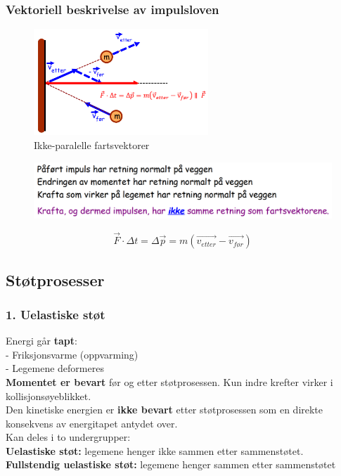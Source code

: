 \documentclass[12pt]{article}
\begin{document}
\subsubsection{Vektoriell beskrivelse av impulsloven}
\begin{figure} [H]
    \centering
    \includegraphics[height = 4cm]{images/impuls2.png}
    \caption{Ikke-paralelle fartsvektorer}
\end{figure}
\begin{figure} [H]
    
    \includegraphics[width=14cm]{images/impuls-text.png}
\end{figure}

$$\Vec{F}\cdot \Delta t = \Delta \Vec{p} = m(\Vec{v_{etter}} - \Vec{v_{før}})$$


\subsection{Støtprosesser}
\bigskip
\subsubsection{1. Uelastiske støt}
Energi går \textbf{tapt}:\\
- Friksjonsvarme (oppvarming)\\
- Legemene deformeres\\
\bigskip
\textbf{Momentet er bevart} før og etter støtprosessen. Kun indre krefter virker i kollisjonsøyeblikket.\\
\bigskip
Den kinetiske energien er \textbf{ikke bevart} etter støtprosessen som en direkte konsekvens av energitapet antydet over.\\
\bigskip
 Kan deles i to undergrupper: \\
 \textbf{Uelastiske støt:} legemene henger ikke sammen etter sammenstøtet.\\
 \textbf{Fullstendig uelastiske støt:} legemene henger sammen etter sammenstøtet\\
 \bigskip
\end{document}
